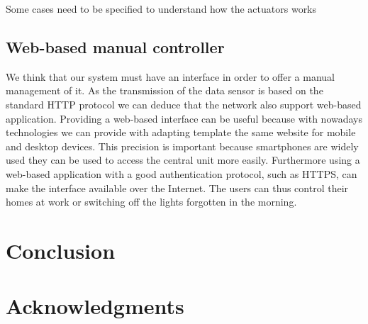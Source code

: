 \documentclass{acm_proc_article-sp}
\begin{document}
Some cases need to be specified to understand how the actuators works

\subsection{Web-based manual controller}
We think that our system must have an interface in order to offer a manual management of it.
As the transmission of the data sensor is based on the standard HTTP protocol we can deduce that the network also support web-based application.
Providing a web-based interface can be useful because with nowadays technologies we can provide with adapting template the same website for mobile and desktop devices.
This precision is important because smartphones are widely used they can be used to access the central unit more easily.
Furthermore using a web-based application with a good authentication protocol, such as HTTPS, can make the interface available over the Internet.
The users can thus control their homes at work or switching off the lights forgotten in the morning.












\section{Conclusion}




\section{Acknowledgments}



%
\end{document}
